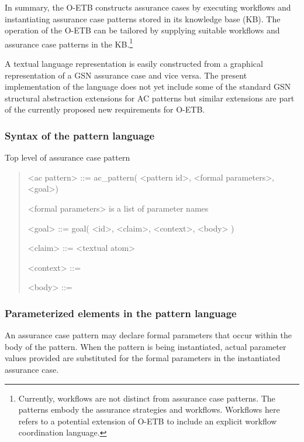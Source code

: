 \documentclass[12pt,twoside,a4paper]{article}
\begin{document}
In summary, the O-ETB constructs assurance cases by executing workflows and instantiating assurance case patterns stored in its knowledge base (KB). The operation of the O-ETB can be tailored by supplying suitable workflows and assurance case patterns in the KB.\footnote{Currently, workflows are not distinct from assurance case patterns. The patterns embody the assurance strategies and workflows. Workflows here refers to a potential extension of O-ETB to include an explicit workflow coordination language.}

A textual language representation is easily constructed from a graphical representation of a GSN assurance case and vice versa. The present implementation of the language does not yet include some of the standard GSN structural abstraction extensions for AC patterns but similar extensions are part of the currently proposed new requirements for O-ETB.

\hypertarget{syntax-of-the-pattern-language}{%
\subsubsection{Syntax of the pattern language}\label{syntax-of-the-pattern-language}}

Top level of assurance case pattern

\begin{quote}
\textless ac pattern\textgreater{} ::= ac\_pattern( \textless pattern id\textgreater, \textless formal parameters\textgreater, \textless goal\textgreater)

\textless formal parameters\textgreater{} is a list of parameter names

\textless goal\textgreater{} ::= goal( \textless id\textgreater, \textless claim\textgreater, \textless context\textgreater, \textless body\textgreater{} )

\textless claim\textgreater{} ::= \textless textual atom\textgreater{}

\textless context\textgreater{} ::=

\textless body\textgreater{} ::=
\end{quote}
\hypertarget{parameterized-elements-in-the-pattern-language}{%
\subsubsection{Parameterized elements in the pattern language}\label{parameterized-elements-in-the-pattern-language}}

An assurance case pattern may declare formal parameters that occur within the body of the pattern. When the pattern is being instantiated, actual parameter values provided are substituted for the formal parameters in the instantiated assurance case.
\end{document}
